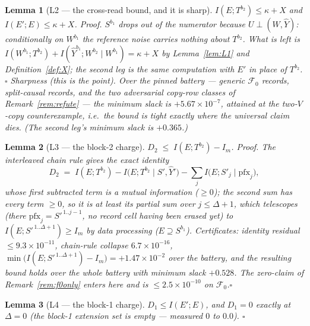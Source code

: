 \documentclass[11pt]{article}
\newtheorem{lemma}{Lemma}
\theoremstyle{definition}
\theoremstyle{remark}
\begin{document}
\begin{lemma}[L2 --- the cross-read bound, and it is sharp]
\label{lem:L2}
$I(E;T^{b_2})\le\kappa+X$ and $I(E';E)\le\kappa+X$.
\emph{Proof.} $S^{b_1}$ drops out of the numerator because
$U\perp(W,\hat Y)$: conditionally on $W^{b_1}$ the reference noise
carries nothing about $T^{b_2}$. What is left is
$I(W^{b_1};T^{b_2})+I(\hat Y^{b_1};W^{b_2}\mid W^{b_1})=\kappa+X$ by
Lemma~\ref{lem:L1} and Definition~\ref{def:X}; the second leg is the
same computation with $E'$ in place of $T^{b_2}$.\hfill$\square$
\emph{Sharpness (this is the point).} Over the pinned battery ---
generic $\mathcal F_0$ records, split-causal records, and the two
adversarial copy-row classes of Remark~\ref{rem:refute} --- the minimum
slack is $+5.67\times10^{-7}$, attained \emph{at the two-$V$-copy
counterexample}, i.e.\ the bound is tight exactly where the universal
claim dies. (The second leg's minimum slack is $+0.365$.)
\end{lemma}

\begin{lemma}[L3 --- the block-2 charge]
\label{lem:L3}
$D_2\;\le\;I(E;T^{b_2})-I_m$. \emph{Proof.} The interleaved chain rule
gives the exact identity
\[
D_2\;=\;I(E;T^{b_2})-I\bigl(E;T^{b_2}\mid S',\hat Y'\bigr)
-\sum_{j}I\bigl(E;S'_j\mid \mathrm{pfx}_j\bigr) ,
\]
whose first subtracted term is a mutual information ($\ge0$); the
second sum has every term $\ge0$, so it is at least its partial sum
over $j\le\Delta+1$, which telescopes (there $\mathrm{pfx}_j=S'^{\,
1..j-1}$, no record cell having been erased yet) to
$I(E;S'^{\,1..\Delta+1})\ge I_m$ by data processing
($E\supseteq S^{b_1}$). Certificates: identity residual
$\le9.3\times10^{-11}$, chain-rule collapse $6.7\times10^{-16}$,
$\min\bigl(I(E;S'^{\,1..\Delta+1})-I_m\bigr)=+1.47\times10^{-2}$ over
the battery, and
the resulting bound holds over the whole battery with minimum slack
$+0.528$. The zero-claim of Remark~\ref{rem:f0only} enters here and is
$\le2.5\times10^{-10}$ on $\mathcal F_0$.\hfill$\square$
\end{lemma}

\begin{lemma}[L4 --- the block-1 charge]
\label{lem:L4}
$D_1\le I(E';E)$, and $D_1=0$ \emph{exactly} at $\Delta=0$ (the
block-1 extension set is empty --- measured $0$ to $0.0$).
\hfill$\square$
\end{lemma}
\end{document}
